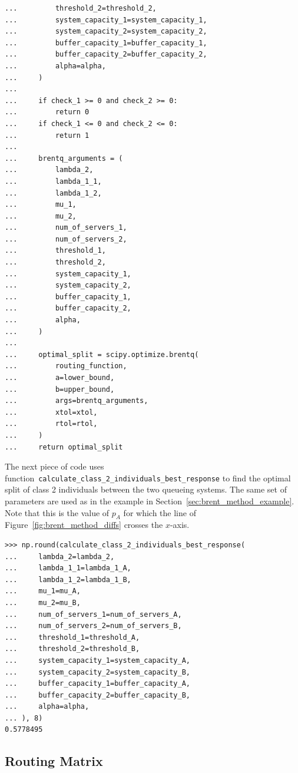\begin{lstlisting}[style=pystyle]
...         threshold_2=threshold_2,
...         system_capacity_1=system_capacity_1,
...         system_capacity_2=system_capacity_2,
...         buffer_capacity_1=buffer_capacity_1,
...         buffer_capacity_2=buffer_capacity_2,
...         alpha=alpha,
...     )
...
...     if check_1 >= 0 and check_2 >= 0:
...         return 0
...     if check_1 <= 0 and check_2 <= 0:
...         return 1
...
...     brentq_arguments = (
...         lambda_2,
...         lambda_1_1,
...         lambda_1_2,
...         mu_1,
...         mu_2,
...         num_of_servers_1,
...         num_of_servers_2,
...         threshold_1,
...         threshold_2,
...         system_capacity_1,
...         system_capacity_2,
...         buffer_capacity_1,
...         buffer_capacity_2,
...         alpha,
...     )
...
...     optimal_split = scipy.optimize.brentq(
...         routing_function,
...         a=lower_bound,
...         b=upper_bound,
...         args=brentq_arguments,
...         xtol=xtol,
...         rtol=rtol,
...     )
...     return optimal_split

\end{lstlisting}

The next piece of code uses
function~\lstinline[style=pystyle]{calculate_class_2_individuals_best_response}
to find the optimal split of class 2 individuals between the two queueing
systems.
The same set of parameters are used as in the example in
Section~\ref{sec:brent_method_example}.
Note that this is the value of \(p_A\) for which the line of
Figure~\ref{fig:brent_method_diffs} crosses the \(x\)-axis.

\begin{lstlisting}[style=pystyle]
>>> np.round(calculate_class_2_individuals_best_response(
...     lambda_2=lambda_2,
...     lambda_1_1=lambda_1_A,
...     lambda_1_2=lambda_1_B,
...     mu_1=mu_A,
...     mu_2=mu_B,
...     num_of_servers_1=num_of_servers_A,
...     num_of_servers_2=num_of_servers_B,
...     threshold_1=threshold_A,
...     threshold_2=threshold_B,
...     system_capacity_1=system_capacity_A,
...     system_capacity_2=system_capacity_B,
...     buffer_capacity_1=buffer_capacity_A,
...     buffer_capacity_2=buffer_capacity_B,
...     alpha=alpha,
... ), 8)
0.5778495

\end{lstlisting}


\subsection{Routing Matrix}


